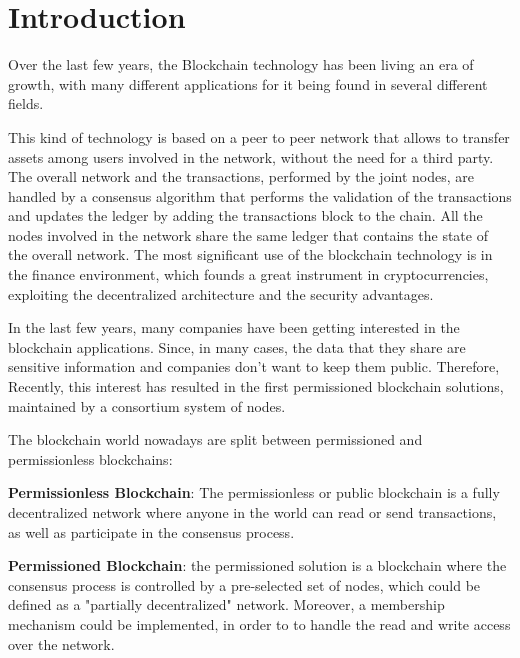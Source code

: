 \chapter{Introduction}

Over the last few years, the Blockchain technology has been living an era of growth, with  many different applications for 
it being found in several different fields. 
\bigskip

This kind of technology is based on a peer to peer network that allows to transfer assets among users involved in the 
network, without the need for a third party. The overall network and the transactions, performed by the joint nodes, 
are handled by a consensus algorithm that performs the validation of the transactions and updates the ledger by adding 
the transactions block to the chain. All the nodes involved in the network share the same ledger that contains the 
state of the overall network. 
The most significant use of the blockchain technology is in the finance environment, which founds a great instrument 
in cryptocurrencies, exploiting the decentralized architecture and the security advantages.
\bigskip

In the last few years, many companies have been getting interested in the blockchain applications. Since, in many cases, 
the data that they share are sensitive information and companies don't want to keep them public. Therefore, 
Recently, this interest has resulted in the first permissioned blockchain solutions, maintained by a consortium 
system of nodes.
\bigskip

The blockchain world nowadays are split between permissioned and permissionless blockchains:
\begin{outline}
    \1 \textbf{Permissionless Blockchain}: The permissionless or public blockchain is a fully decentralized network where anyone in the
    world can read or send transactions, as well as participate in the consensus process.

    \1 \textbf{Permissioned Blockchain}: the permissioned solution is a blockchain where the consensus process is controlled by a 
    pre-selected set of nodes, which could be defined as a "partially decentralized" network. Moreover, a membership mechanism could 
    be implemented, in order to to handle the read and write access over the network. 
\end{outline}

